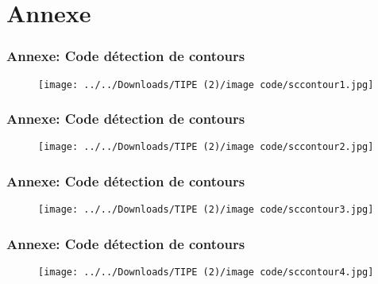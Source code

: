 \documentclass{beamer}
\begin{document}
\section{Annexe}

\begin{frame}[fragile]
\frametitle{Annexe: Code détection de contours}
\begin{figure}[h]
    \begin{minipage}[c]{.46\linewidth}
        \centering
        \texttt{[image: ../../Downloads/TIPE (2)/image code/sccontour1.jpg]}

    \end{minipage}
\end{figure}
\end{frame}

\begin{frame}[fragile]
\frametitle{Annexe: Code détection de contours}
\begin{figure}[h]
    \begin{minipage}[c]{.46\linewidth}
        \centering
        \texttt{[image: ../../Downloads/TIPE (2)/image code/sccontour2.jpg]}

    \end{minipage}
\end{figure}
\end{frame}

\begin{frame}[fragile]
\frametitle{Annexe: Code détection de contours}
\begin{figure}[h]
    \begin{minipage}[c]{.46\linewidth}
        \centering
        \texttt{[image: ../../Downloads/TIPE (2)/image code/sccontour3.jpg]}

    \end{minipage}
\end{figure}
\end{frame}

\begin{frame}[fragile]
\frametitle{Annexe: Code détection de contours}
\begin{figure}[h]
    \begin{minipage}[c]{.46\linewidth}
        \centering
        \texttt{[image: ../../Downloads/TIPE (2)/image code/sccontour4.jpg]}

    \end{minipage}
\end{figure}
\end{frame}
\end{document}
